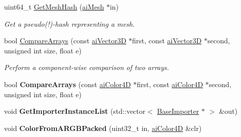 \begin{DoxyCompactItemize}
\item 
uint64\+\_\+t \hyperlink{namespace_assimp_aa55ce1d958f3732c90f748b2e7d44293}{Get\+Mesh\+Hash} (\hyperlink{structai_mesh}{ai\+Mesh} $\ast$in)
\begin{DoxyCompactList}\small\item\em Get a pseudo(!)-\/hash representing a mesh. \end{DoxyCompactList}\item 
bool \hyperlink{namespace_assimp_a199e9276257039959c3a5d2110b36980}{Compare\+Arrays} (const \hyperlink{structai_vector3_d}{ai\+Vector3\+D} $\ast$first, const \hyperlink{structai_vector3_d}{ai\+Vector3\+D} $\ast$second, unsigned int size, float e)
\begin{DoxyCompactList}\small\item\em Perform a component-\/wise comparison of two arrays. \end{DoxyCompactList}\item 
\hypertarget{namespace_assimp_a9a59e9539ff88bcc39288fc026c720c4}{bool {\bfseries Compare\+Arrays} (const \hyperlink{structai_color4_d}{ai\+Color4\+D} $\ast$first, const \hyperlink{structai_color4_d}{ai\+Color4\+D} $\ast$second, unsigned int size, float e)}\label{namespace_assimp_a9a59e9539ff88bcc39288fc026c720c4}

\item 
\hypertarget{namespace_assimp_aff98691265aed9a04bc7d08806b9497b}{void {\bfseries Get\+Importer\+Instance\+List} (std\+::vector$<$ \hyperlink{class_assimp_1_1_base_importer}{Base\+Importer} $\ast$ $>$ \&out)}\label{namespace_assimp_aff98691265aed9a04bc7d08806b9497b}

\item 
\hypertarget{namespace_assimp_a3ee32879e32a479a0488614f64408fd9}{void {\bfseries Color\+From\+A\+R\+G\+B\+Packed} (uint32\+\_\+t in, \hyperlink{structai_color4_d}{ai\+Color4\+D} \&clr)}\label{namespace_assimp_a3ee32879e32a479a0488614f64408fd9}


\end{DoxyCompactItemize}
